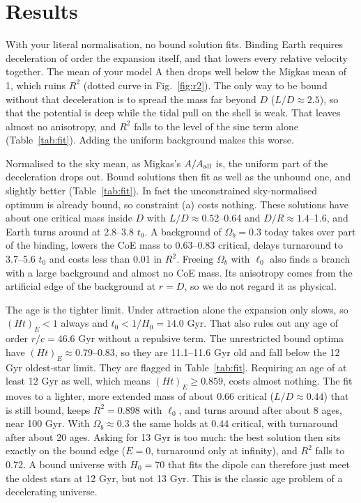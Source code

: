 \documentclass[10pt,letterpaper]{article}
\begin{document}
\section{Results}
With your literal normalisation, no bound solution fits. Binding Earth requires deceleration of order the expansion itself, and that lowers every relative velocity together. The mean of your model A then drops well below the Migkas mean of 1, which ruins $R^2$ (dotted curve in Fig.~\ref{fig:r2}). The only way to be bound without that deceleration is to spread the mass far beyond $D$ ($L/D\approx2.5$), so that the potential is deep while the tidal pull on the shell is weak. That leaves almost no anisotropy, and $R^2$ falls to the level of the sine term alone (Table~\ref{tab:fit}). Adding the uniform background makes this worse.

Normalised to the sky mean, as Migkas's $A/A_{\rm all}$ is, the uniform part of the deceleration drops out. Bound solutions then fit as well as the unbound one, and slightly better (Table~\ref{tab:fit}). In fact the unconstrained sky-normalised optimum is already bound, so constraint (a) costs nothing. These solutions have about one critical mass inside $D$ with $L/D\approx0.52$--0.64 and $D/R\approx1.4$--1.6, and Earth turns around at 2.8--3.8 $t_0$. A background of $\Omega_b=0.3$ today takes over part of the binding, lowers the CoE mass to 0.63--0.83 critical, delays turnaround to 3.7--5.6 $t_0$ and costs less than 0.01 in $R^2$. Freeing $\Omega_b$ with $\ell_0$ also finds a branch with a large background and almost no CoE mass. Its anisotropy comes from the artificial edge of the background at $r=D$, so we do not regard it as physical.

The age is the tighter limit. Under attraction alone the expansion only slows, so $(Ht)_E<1$ always and $t_0<1/H_0=14.0$ Gyr. That also rules out any age of order $r/c=46.6$ Gyr without a repulsive term. The unrestricted bound optima have $(Ht)_E\approx0.79$--0.83, so they are 11.1--11.6 Gyr old and fall below the 12 Gyr oldest-star limit. They are flagged in Table~\ref{tab:fit}. Requiring an age of at least 12 Gyr as well, which means $(Ht)_E\ge0.859$, costs almost nothing. The fit moves to a lighter, more extended mass of about 0.66 critical ($L/D\approx0.44$) that is still bound, keeps $R^2=0.898$ with $\ell_0$, and turns around after about 8 ages, near 100 Gyr. With $\Omega_b\approx0.3$ the same holds at 0.44 critical, with turnaround after about 20 ages. Asking for 13 Gyr is too much: the best solution then sits exactly on the bound edge ($E=0$, turnaround only at infinity), and $R^2$ falls to 0.72. A bound universe with $H_0=70$ that fits the dipole can therefore just meet the oldest stars at 12 Gyr, but not 13 Gyr. This is the classic age problem of a decelerating universe.
\end{document}
